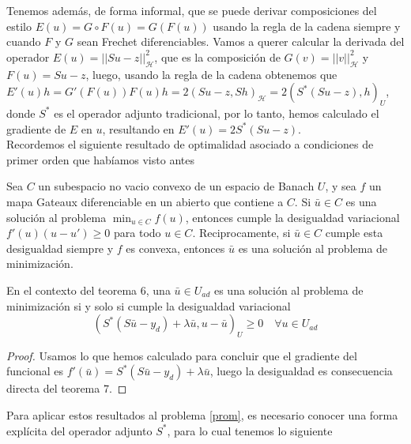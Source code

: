 \documentclass{article}
\begin{document}
\noindent 
Tenemos además, de forma informal, que se puede derivar composiciones del estilo $E(u)=G\circ F(u)=G(F(u))$ usando la regla de la cadena siempre y cuando $F$ y $G$ sean Frechet diferenciables. Vamos a querer calcular la derivada del operador $E(u)=||Su-z||_{\mathcal{H}}^2$, que es la composición de $G(v)=||v||_{\mathcal{H}}^2$ y $F(u)=Su-z$, luego, usando la regla de la cadena obtenemos que $E'(u)h=G'(F(u))F(u)h=2(Su-z,Sh)_{\mathcal{H}}=2(S^{*}(Su-z),h)_{U}$, donde $S^{*}$ es el operador adjunto tradicional, por lo tanto, hemos calculado el gradiente de $E$ en $u$, resultando en $E'(u)=2S^{*}(Su-z)$.\\

\noindent
Recordemos el siguiente resultado de optimalidad asociado a condiciones de primer orden que habíamos visto antes
\begin{theorem}
Sea $C$ un subespacio no vacio convexo de un espacio de Banach $U$, y sea $f$ un mapa Gateaux diferenciable en un abierto que contiene a $C$. Si $\bar{u}\in C$ es una solución al problema $\min_{u\in C}f(u)$, entonces cumple la desigualdad variacional $f'(u)(u-u')\geq 0$ para todo $u\in C$. Reciprocamente, si $\bar{u}\in C$ cumple esta desigualdad siempre y $f$ es convexa, entonces $\bar{u}$ es una solución al problema de minimización.
\end{theorem}

\begin{theorem}
En el contexto del teorema 6, una $\bar{u}\in U_{ad}$ es una solución al problema de minimización si y solo si cumple la desigualdad variacional
\begin{equation}\left(S^{*}\left(S \bar{u}-y_{d}\right)+\lambda \bar{u}, u-\bar{u}\right)_{U} \geq 0 \quad \forall u \in U_{a d}\end{equation}
\end{theorem}
\begin{proof}
Usamos lo que hemos calculado para concluir que el gradiente del funcional es $f'(\bar{u})=S^{*}(S\bar{u}-y_d)+\lambda \bar{u}$, luego la desigualdad es consecuencia directa del teorema 7.
\end{proof}

\noindent
Para aplicar estos resultados al problema \ref{prom}, es necesario conocer una forma explícita del operador adjunto $S^{*}$, para lo cual tenemos lo siguiente
\end{document}
